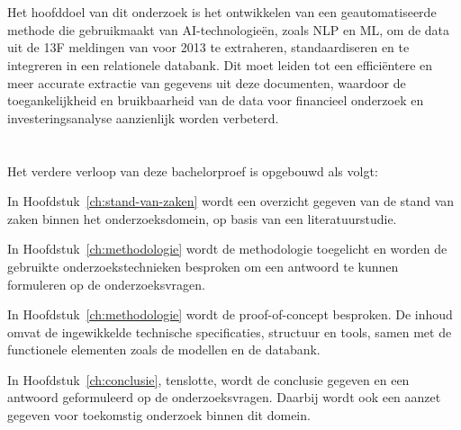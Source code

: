\section{}%
\label{sec:onderzoeksdoelstelling}

Het hoofddoel van dit onderzoek is het ontwikkelen van een geautomatiseerde methode die gebruikmaakt van AI-technologieën, zoals NLP en ML, om de data uit de 13F meldingen van voor 2013 te extraheren, standaardiseren en te integreren in een relationele databank. Dit moet leiden tot een efficiëntere en meer accurate extractie van gegevens uit deze documenten, waardoor de toegankelijkheid en bruikbaarheid van de data voor financieel onderzoek en investeringsanalyse aanzienlijk worden verbeterd. 


\section{}%
\label{sec:opzet-bachelorproef}


Het verdere verloop van deze bachelorproef is opgebouwd als volgt:

In Hoofdstuk~\ref{ch:stand-van-zaken} wordt een overzicht gegeven van de stand van zaken binnen het onderzoeksdomein, op basis van een literatuurstudie.

In Hoofdstuk~\ref{ch:methodologie} wordt de methodologie toegelicht en worden de gebruikte onderzoekstechnieken besproken om een antwoord te kunnen formuleren op de onderzoeksvragen.

In Hoofdstuk~\ref{ch:methodologie}  wordt de proof-of-concept besproken. De inhoud omvat de ingewikkelde technische specificaties, structuur en tools, samen met de functionele elementen zoals de modellen en de databank.


In Hoofdstuk~\ref{ch:conclusie}, tenslotte, wordt de conclusie gegeven en een antwoord geformuleerd op de onderzoeksvragen. Daarbij wordt ook een aanzet gegeven voor toekomstig onderzoek binnen dit domein.